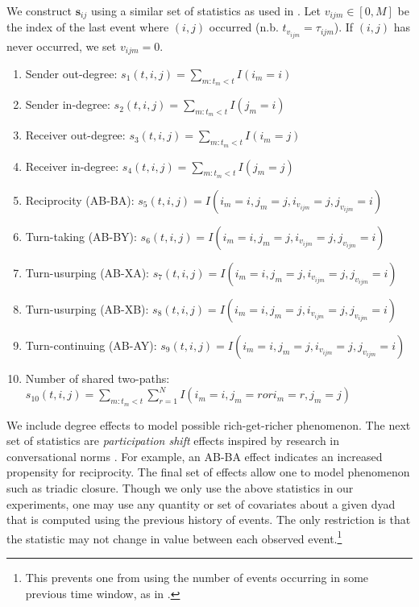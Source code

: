 \documentclass[11pt]{article}
\begin{document}
We construct $\mathbf{s}_{ij}$ using a similar set of statistics as used in \cite{Butts2008,Vu2011}. Let $v_{ijm} \in [0,M]$ be the index of the last event where $(i,j)$ occurred (n.b. $t_{v_{ijm}} = \tau_{ijm}$). If $(i,j)$ has never occurred, we set $v_{ijm}=0$.  
\begin{enumerate}
\item Sender out-degree: $s_{1}(t,i,j) = \sum_{m:t_m<t} I(i_m=i)$
\item Sender in-degree: $s_{2}(t,i,j) = \sum_{m:t_m<t} I(j_m=i)$
\item Receiver out-degree: $s_{3}(t,i,j) = \sum_{m:t_m<t} I(i_m=j)$
\item Receiver in-degree: $s_{4}(t,i,j) = \sum_{m:t_m<t} I(j_m=j)$
\item Reciprocity (AB-BA): $s_{5}(t,i,j) = I(i_m=i,j_m=j,i_{v_{ijm}}=j,j_{v_{ijm}}=i)$
\item Turn-taking (AB-BY): $s_{6}(t,i,j) = I(i_m=i,j_m=j,i_{v_{ijm}}=j,j_{v_{ijm}}=i)$
\item Turn-usurping (AB-XA): $s_{7}(t,i,j) = I(i_m=i,j_m=j,i_{v_{ijm}}=j,j_{v_{ijm}}=i)$
\item Turn-usurping (AB-XB): $s_{8}(t,i,j) = I(i_m=i,j_m=j,i_{v_{ijm}}=j,j_{v_{ijm}}=i)$
\item Turn-continuing (AB-AY): $s_{9}(t,i,j) =  I(i_m=i,j_m=j,i_{v_{ijm}}=j,j_{v_{ijm}}=i)$
\item Number of shared two-paths: $s_{10}(t,i,j) =   \sum_{m:t_m<t} \sum_{r=1}^NI(i_m=i,j_m=r or i_m=r,j_m=j)$
\end{enumerate}

We include degree effects to model possible rich-get-richer phenomenon.  The next set of statistics are \emph{participation shift} effects inspired by research in conversational norms \cite{Gibson2003}.  For example, an AB-BA effect indicates an increased propensity for reciprocity.  The final set of effects allow one to model phenomenon such as triadic closure.  Though we only use the above statistics in our experiments, one may use any quantity or set of covariates about a given dyad that is computed using the previous history of events.  The only restriction is that the statistic may not change in value between each observed event.\footnote{This prevents one from using the number of events occurring in some previous time window, as in \cite{Gunawardana2011}.}
\end{document}
